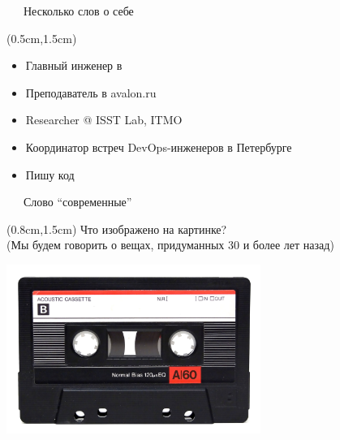 \documentclass[xetex,18pt,aspectratio=43]{beamer}
\begin{document}
\begin{Large}
\begin{frame}{\ \ \ Несколько слов о себе}
\begin{textblock*}{\framewidth-0.8cm}(0.5cm,1.5cm) %
\begin{itemize}
  \item Главный инженер в \href{https://gitinsky.com}{\color{blue}{Git in Sky}}
  \item Преподаватель в avalon.ru
  \item Researcher @ ISST Lab, ITMO
  \item Координатор встреч DevOps-инженеров в Петербурге
  \item Пишу код
\end{itemize}
\end{textblock*}
\end{frame}

\begin{frame}{\ \ \ Слово \enquote{современные}}
\begin{textblock*}{\framewidth}(0.8cm,1.5cm) %
Что изображено на картинке?\\
{\small (Мы будем говорить о вещах, придуманных 30 и более лет назад)}
\begin{minipage}{\textwidth}
  \centering
  \includegraphics[height=5.5cm]{img/cassette}
\end{minipage}
\end{textblock*}
\end{frame}


\end{Large}
\end{document}
